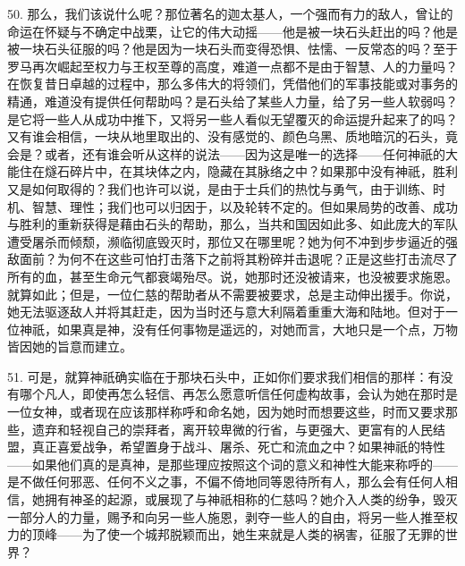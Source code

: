 50. 那么，我们该说什么呢？那位著名的迦太基人，一个强而有力的敌人，曾让的命运在怀疑与不确定中战栗，让它的伟大动摇——他是被一块石头赶出的吗？他是被一块石头征服的吗？他是因为一块石头而变得恐惧、怯懦、一反常态的吗？至于罗马再次崛起至权力与王权至尊的高度，难道一点都不是由于智慧、人的力量吗？在恢复昔日卓越的过程中，那么多伟大的将领们，凭借他们的军事技能或对事务的精通，难道没有提供任何帮助吗？是石头给了某些人力量，给了另一些人软弱吗？是它将一些人从成功中推下，又将另一些人看似无望覆灭的命运提升起来了的吗？又有谁会相信，一块从地里取出的、没有感觉的、颜色乌黑、质地暗沉的石头，竟会是？或者，还有谁会听从这样的说法——因为这是唯一的选择——任何神祇的大能住在燧石碎片中，在其块体之内，隐藏在其脉络之中？如果那中没有神祇，胜利又是如何取得的？我们也许可以说，是由于士兵们的热忱与勇气，由于训练、时机、智慧、理性；我们也可以归因于，以及轮转不定的。但如果局势的改善、成功与胜利的重新获得是藉由石头的帮助，那么，当共和国因如此多、如此庞大的军队遭受屠杀而倾颓，濒临彻底毁灭时，那位又在哪里呢？她为何不冲到步步逼近的强敌面前？为何不在这些可怕打击落下之前将其粉碎并击退呢？正是这些打击流尽了所有的血，甚至生命元气都衰竭殆尽。说，她那时还没被请来，也没被要求施恩。就算如此；但是，一位仁慈的帮助者从不需要被要求，总是主动伸出援手。你说，她无法驱逐敌人并将其赶走，因为当时还与意大利隔着重重大海和陆地。但对于一位神祇，如果真是神，没有任何事物是遥远的，对她而言，大地只是一个点，万物皆因她的旨意而建立。\par

51. 可是，就算神祇确实临在于那块石头中，正如你们要求我们相信的那样：有没有哪个凡人，即使再怎么轻信、再怎么愿意听信任何虚构故事，会认为她在那时是一位女神，或者现在应该那样称呼和命名她，因为她时而想要这些，时而又要求那些，遗弃和轻视自己的崇拜者，离开较卑微的行省，与更强大、更富有的人民结盟，真正喜爱战争，希望置身于战斗、屠杀、死亡和流血之中？如果神祇的特性——如果他们真的是真神，是那些理应按照这个词的意义和神性大能来称呼的——是不做任何邪恶、任何不义之事，不偏不倚地同等恩待所有人，那么会有任何人相信，她拥有神圣的起源，或展现了与神祇相称的仁慈吗？她介入人类的纷争，毁灭一部分人的力量，赐予和向另一些人施恩，剥夺一些人的自由，将另一些人推至权力的顶峰——为了使一个城邦脱颖而出，她生来就是人类的祸害，征服了无罪的世界？\par

